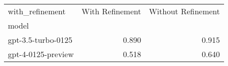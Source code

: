 \begin{tabular}{lrr}
\toprule
with_refinement & With Refinement & Without Refinement \\
model &  &  \\
\midrule
gpt-3.5-turbo-0125 & 0.890 & 0.915 \\
gpt-4-0125-preview & 0.518 & 0.640 \\
\bottomrule
\end{tabular}
